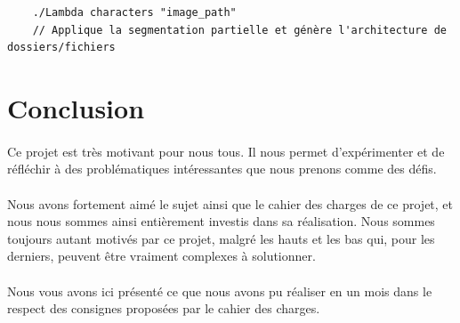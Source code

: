 \documentclass{article}
\begin{document}
\begin{lstlisting}
	./Lambda characters "image_path"
	// Applique la segmentation partielle et génère l'architecture de dossiers/fichiers
\end{lstlisting}



\newpage
{}
\section{Conclusion}

\paragraph{}Ce projet est très motivant pour nous tous. Il nous permet d'expérimenter et de réfléchir à des problématiques intéressantes que nous prenons comme des défis. 

\paragraph{}Nous avons fortement aimé le sujet ainsi que le cahier des charges de ce projet, et nous nous sommes ainsi entièrement investis dans sa réalisation. Nous sommes toujours autant motivés par ce projet, malgré les hauts et les bas qui, pour les derniers, peuvent être vraiment complexes à solutionner.\\

\paragraph{}Nous vous avons ici présenté ce que nous avons pu réaliser en un mois dans le respect des consignes proposées par le cahier des charges.


\newpage
\end{document}

